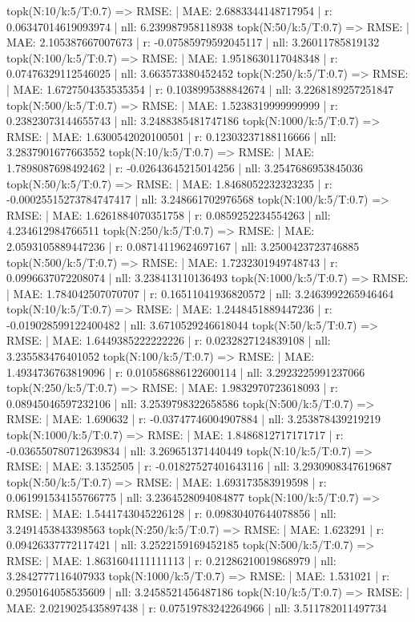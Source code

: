 topk(N:10/k:5/T:0.7) => RMSE: | MAE: 2.6883344148717954 | r: 0.06347014619093974 | nll: 6.239987958118938
topk(N:50/k:5/T:0.7) => RMSE: | MAE: 2.105387667007673 | r: -0.07585979592045117 | nll: 3.26011785819132
topk(N:100/k:5/T:0.7) => RMSE: | MAE: 1.9518630117048348 | r: 0.07476329112546025 | nll: 3.663573380452452
topk(N:250/k:5/T:0.7) => RMSE: | MAE: 1.6727504353535354 | r: 0.1038995388842674 | nll: 3.2268189257251847
topk(N:500/k:5/T:0.7) => RMSE: | MAE: 1.5238319999999999 | r: 0.23823073144655743 | nll: 3.2488385481747186
topk(N:1000/k:5/T:0.7) => RMSE: | MAE: 1.6300542020100501 | r: 0.12303237188116666 | nll: 3.2837901677663552
topk(N:10/k:5/T:0.7) => RMSE: | MAE: 1.7898087698492462 | r: -0.02643645215014256 | nll: 3.2547686953845036
topk(N:50/k:5/T:0.7) => RMSE: | MAE: 1.8468052232323235 | r: -0.00025515273784747417 | nll: 3.248661702976568
topk(N:100/k:5/T:0.7) => RMSE: | MAE: 1.6261884070351758 | r: 0.0859252234554263 | nll: 4.234612984766511
topk(N:250/k:5/T:0.7) => RMSE: | MAE: 2.0593105889447236 | r: 0.08714119624697167 | nll: 3.2500423723746885
topk(N:500/k:5/T:0.7) => RMSE: | MAE: 1.7232301949748743 | r: 0.0996637072208074 | nll: 3.238413110136493
topk(N:1000/k:5/T:0.7) => RMSE: | MAE: 1.784042507070707 | r: 0.16511041936820572 | nll: 3.2463992265946464
topk(N:10/k:5/T:0.7) => RMSE: | MAE: 1.2448451889447236 | r: -0.019028599122400482 | nll: 3.6710529246618044
topk(N:50/k:5/T:0.7) => RMSE: | MAE: 1.6449385222222226 | r: 0.0232827124839108 | nll: 3.235583476401052
topk(N:100/k:5/T:0.7) => RMSE: | MAE: 1.4934736763819096 | r: 0.010586886122600114 | nll: 3.2923225991237066
topk(N:250/k:5/T:0.7) => RMSE: | MAE: 1.9832970723618093 | r: 0.08945046597232106 | nll: 3.2539798322658586
topk(N:500/k:5/T:0.7) => RMSE: | MAE: 1.690632 | r: -0.03747746004907884 | nll: 3.253878439219219
topk(N:1000/k:5/T:0.7) => RMSE: | MAE: 1.8486812717171717 | r: -0.036550780712639834 | nll: 3.269651371440449
topk(N:10/k:5/T:0.7) => RMSE: | MAE: 3.1352505 | r: -0.01827527401643116 | nll: 3.2930908347619687
topk(N:50/k:5/T:0.7) => RMSE: | MAE: 1.693173583919598 | r: 0.061991534155766775 | nll: 3.2364528094084877
topk(N:100/k:5/T:0.7) => RMSE: | MAE: 1.5441743045226128 | r: 0.09830407644078856 | nll: 3.2491453843398563
topk(N:250/k:5/T:0.7) => RMSE: | MAE: 1.623291 | r: 0.09426337772117421 | nll: 3.2522159169452185
topk(N:500/k:5/T:0.7) => RMSE: | MAE: 1.8631604111111113 | r: 0.21286210019868979 | nll: 3.2842777116407933
topk(N:1000/k:5/T:0.7) => RMSE: | MAE: 1.531021 | r: 0.2950164058535609 | nll: 3.2458521456487186
topk(N:10/k:5/T:0.7) => RMSE: | MAE: 2.0219025435897438 | r: 0.07519783242264966 | nll: 3.511782011497734
